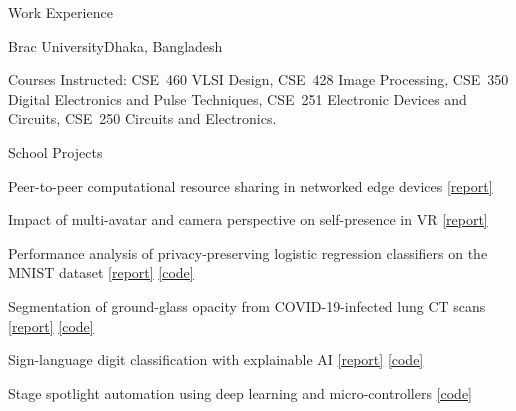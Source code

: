 \documentclass{resume} %
\begin{document}
\begin{rSection}{Work Experience}
\begin{rExperienceSubsection}{Brac University}{Dhaka, Bangladesh}
\begin{experienceDetails}
\item Courses Instructed: CSE~460 VLSI Design, CSE~428 Image Processing, CSE~350 Digital Electronics and Pulse Techniques, CSE~251 Electronic Devices and Circuits, CSE~250 Circuits and Electronics.
\end{experienceDetails}
\end{rExperienceSubsection}
\end{rSection}


\begin{rSection}{School Projects}
\begin{rSubsection}{}{}{}{}
\item {Peer-to-peer computational resource sharing in networked edge devices} \href{https://drive.google.com/file/d/1Lafv-SuVHzafwqal0EaITKnVUbDYEHu2/view?usp=sharing}{[report]}
\item {Impact of multi-avatar and camera perspective on self-presence in VR} \href{https://drive.google.com/file/d/1P_jILWP8epVtBue5T3bOqXPZS9Foiz3g/view?usp=sharing}{[report]}
\item {Performance analysis of privacy-preserving logistic regression classifiers on the MNIST dataset} \href{https://drive.google.com/file/d/1Mg9cmB_fsOogLUmQES2HTe_Y_t_cnWci/view?usp=sharing}{[report]} \href{https://colab.research.google.com/drive/1pq2lDIiGz69ul1-Sq3hXFPuL3zPMKJ77?usp=sharing}{[code]}
\item {Segmentation of ground-glass opacity from COVID-19-infected lung CT scans} \href{https://drive.google.com/file/d/1iKRiSHn4lJl0LL3dFWYe0kpUWCQJGvXh/view?usp=sharing}{[report]} \href{https://colab.research.google.com/drive/1kDJH4AJ3njdbcetet8FWRf06Lb3aqJLu?usp=sharing}{[code]}
\item {Sign-language digit classification with explainable AI} \href{https://drive.google.com/file/d/1TDehVQOl_FuYqt7KgqhHKxvP0jzkwvNh/view?usp=sharing}{[report]} \href{https://colab.research.google.com/drive/1svKnj5qgj34ILJNW0x-iJLmTnzsYRXKT?usp=sharing}{[code]}
\item {Stage spotlight automation using deep learning and micro-controllers} \href{https://github.com/tanvir9476/StageLightAutomation/blob/master/code.py}{[code]}

\end{rSubsection}
\end{rSection}
\end{document}
